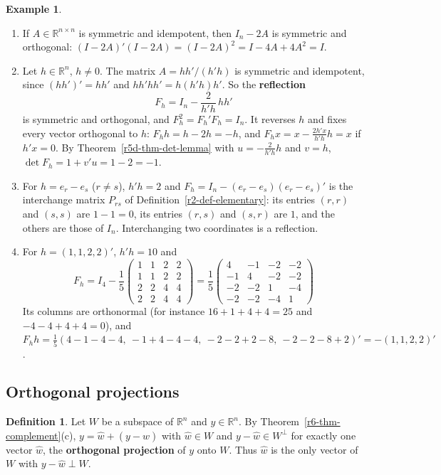 \documentclass[12pt]{article}
\newcommand{\R}{\mathbb R}
\theoremstyle{definition}
\newtheorem{definition}[theorem]{Definition}
\newtheorem{example}[theorem]{Example}
\begin{document}
\begin{example}\label{r6-exm-reflection}
\begin{enumerate}
\item If \(A\in\R^{n\times n}\) is symmetric and idempotent, then \(I_n-2A\) is symmetric and orthogonal:
\((I-2A)'(I-2A)=(I-2A)^2=I-4A+4A^2=I\).
\item Let \(h\in\R^n\), \(h\ne0\). The matrix \(A=hh'/(h'h)\) is symmetric and idempotent, since \((hh')'=hh'\) and
\(hh'hh'=h(h'h)h'\). So the \textbf{reflection}
\[
F_h=I_n-\frac2{h'h}\,hh'
\]
is symmetric and orthogonal, and \(F_h^2=F_h'F_h=I_n\). It reverses \(h\) and fixes every vector orthogonal to
\(h\): \(F_hh=h-2h=-h\), and \(F_hx=x-\frac{2h'x}{h'h}h=x\) if \(h'x=0\). By Theorem~\ref{r5d-thm-det-lemma}
with \(u=-\frac2{h'h}h\) and \(v=h\), \(\det F_h=1+v'u=1-2=-1\).
\item For \(h=e_r-e_s\) (\(r\ne s\)), \(h'h=2\) and \(F_h=I_n-(e_r-e_s)(e_r-e_s)'\) is the interchange matrix
\(P_{rs}\) of Definition~\ref{r2-def-elementary}: its entries \((r,r)\) and \((s,s)\) are \(1-1=0\), its entries
\((r,s)\) and \((s,r)\) are \(1\), and the others are those of \(I_n\). Interchanging two coordinates is a
reflection.
\item For \(h=(1,1,2,2)'\), \(h'h=10\) and
\[
F_h=I_4-\frac15\begin{pmatrix}1&1&2&2\\1&1&2&2\\2&2&4&4\\2&2&4&4\end{pmatrix}
=\frac15\begin{pmatrix}4&-1&-2&-2\\-1&4&-2&-2\\-2&-2&1&-4\\-2&-2&-4&1\end{pmatrix}
\]
Its columns are orthonormal (for instance \(16+1+4+4=25\) and \(-4-4+4+4=0\)), and
\(F_hh=\frac15(4-1-4-4,\ -1+4-4-4,\ -2-2+2-8,\ -2-2-8+2)'=-(1,1,2,2)'\).
\end{enumerate}
\end{example}

\subsection*{Orthogonal projections}

\begin{definition}\label{r6-def-projection}
Let \(W\) be a subspace of \(\R^n\) and \(y\in\R^n\). By Theorem~\ref{r6-thm-complement}(c),
\(y=\hat w+(y-\hat w)\) with \(\hat w\in W\) and \(y-\hat w\in W^\perp\) for exactly one vector \(\hat w\), the
\textbf{orthogonal projection} of \(y\) onto \(W\). Thus \(\hat w\) is the only vector of \(W\) with
\(y-\hat w\perp W\).
\end{definition}
\end{document}
